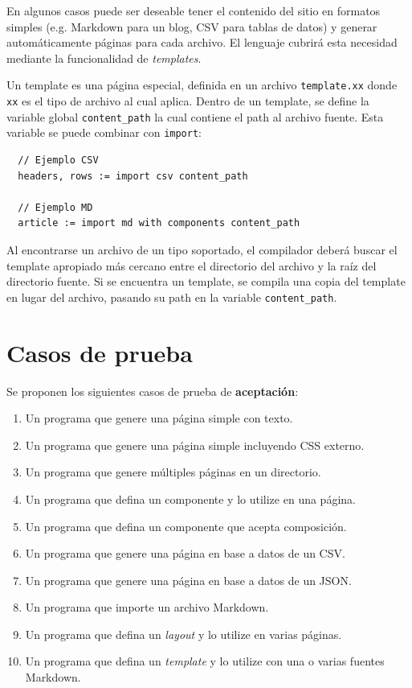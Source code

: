 En algunos casos puede ser deseable tener el contenido del sitio en formatos
simples (e.g. Markdown para un blog, CSV para tablas de datos) y generar
automáticamente páginas para cada archivo. El lenguaje cubrirá esta necesidad
mediante la funcionalidad de \textit{templates}.

Un template es una página especial, definida en un archivo \texttt{template.xx}
donde \texttt{xx} es el tipo de archivo al cual aplica. Dentro de un template,
se define la variable global \texttt{content\_path} la cual contiene el path al
archivo fuente. Esta variable se puede combinar con \texttt{import}:

\pagebreak
\small
\begin{verbatim}
  // Ejemplo CSV
  headers, rows := import csv content_path

  // Ejemplo MD
  article := import md with components content_path
\end{verbatim}
\normalsize

Al encontrarse un archivo de un tipo soportado, el compilador deberá buscar el
template apropiado más cercano entre el directorio del archivo y la raíz del
directorio fuente. Si se encuentra un template, se compila una copia del template
en lugar del archivo, pasando su path en la variable \texttt{content\_path}.

\section{Casos de prueba}

Se proponen los siguientes casos de prueba de \textbf{aceptación}:

\begin{enumerate}
	\item Un programa que genere una página simple con texto.
	\item Un programa que genere una página simple incluyendo CSS externo.
	\item Un programa que genere múltiples páginas en un directorio.
	\item Un programa que defina un componente y lo utilize en una página.
	\item Un programa que defina un componente que acepta composición.
	\item Un programa que genere una página en base a datos de un CSV.
	\item Un programa que genere una página en base a datos de un JSON.
	\item Un programa que importe un archivo Markdown.
	\item Un programa que defina un \textit{layout} y lo utilize en varias páginas.
	\item Un programa que defina un \textit{template} y lo utilize con una o varias
	  fuentes Markdown.
\end{enumerate}

